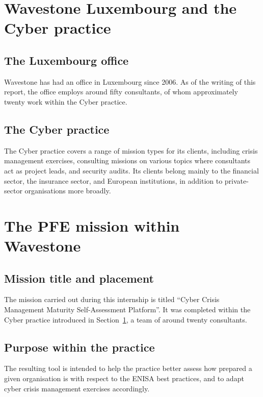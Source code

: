 \section{Wavestone Luxembourg and the Cyber practice}
\label{sec:framing-luxembourg}

\subsection{The Luxembourg office}

Wavestone has had an office in Luxembourg since 2006. As of the writing of
this report, the office employs around fifty consultants, of whom
approximately twenty work within the Cyber practice.

\subsection{The Cyber practice}

The Cyber practice covers a range of mission types for its clients,
including crisis management exercises, consulting missions on various
topics where consultants act as project leads, and security audits. Its
clients belong mainly to the financial sector, the insurance sector, and
European institutions, in addition to private-sector organisations more
broadly.

\section{The PFE mission within Wavestone}
\label{sec:framing-mission}

\subsection{Mission title and placement}

The mission carried out during this internship is titled ``Cyber Crisis
Management Maturity Self-Assessment Platform''. It was completed within
the Cyber practice introduced in Section~\ref{sec:framing-luxembourg}, a
team of around twenty consultants.

\subsection{Purpose within the practice}

The resulting tool is intended to help the practice better assess how
prepared a given organisation is with respect to the ENISA best practices,
and to adapt cyber crisis management exercises accordingly.

